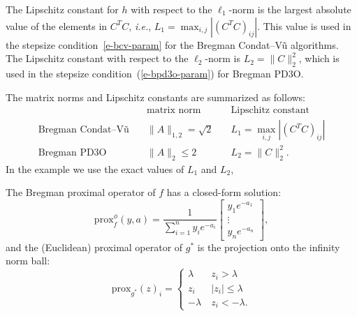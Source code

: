 \documentclass[letterpaper,11pt]{article}
\newcommand{\ie}{{\it i.e.}}
\newcommand{\prox}{\mathrm{prox}}
\begin{document}
The Lipschitz constant for $h$ with respect to the $\ell_1$-norm is
the largest absolute value of the elements in $C^TC$,
\ie, $L_1=\max_{i,j} |(C^TC)_{ij}|$.   This value is used in 
the stepsize condition~\eqref{e-bcv-param} for the
Bregman Condat--V\~u algorithms.
The Lipschitz constant with respect to the $\ell_2$-norm is
$L_2=\|C\|_2^2$, which is used in the stepsize
condition~(\ref{e-bpd3o-param}) for Bregman PD3O.

The matrix norms and Lipschitz constants are summarized as follows:
\[
\begin{array}{lcc}
& \mbox{matrix norm} & \mbox{Lipschitz constant} \\
\mbox{Bregman Condat--V\~u} \quad & \|A\|_{1,2}=\sqrt 2 \quad &
  L_1=\max_{i,j}|(C^TC)_{ij}| \\
\mbox{Bregman PD3O} & \|A\|_2 \leq 2 & L_2=\|C\|_2^2.
\end{array}
\] 
In the example we use the exact values of $L_1$ and $L_2$, 

The Bregman proximal operator of $f$ has a closed-form solution:
\[
\prox_f^\phi(y,a) = \frac{1}{\sum_{i=1}^n y_i e^{-a_i}} \begin{bmatrix}
 y_1 e^{-a_1} \\ \vdots \\ y_n e^{-a_n}
\end{bmatrix},
\]
and the (Euclidean) proximal operator of $g^\ast$ is 
the projection onto the infinity norm ball:
\[
\prox_{g^\ast}(z)_i = \begin{cases}
  \lambda \quad & z_i>\lambda \\
  z_i & |z_i| \leq \lambda \\
  -\lambda & z_i<-\lambda.
\end{cases}
\] 
\end{document}
